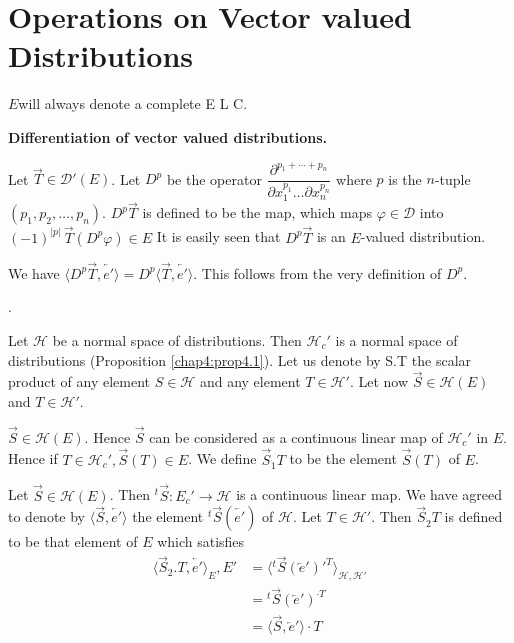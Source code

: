 \chapter{Operations on Vector valued Distributions}\label{chap6}

$E$\pageoriginale will always denote a complete E L C.

\medskip
\noindent
{\bf Differentiation of vector valued distributions.}
\smallskip

Let $\overrightarrow{T} \in \mathscr{D}'(E)$. Let $D^p$ be the
operator $\dfrac{\partial^{p_1+\cdots+ p_n}}{\partial x_{1}^{p_{1}}\ldots
  \partial x_{n}^{p_{n}}}$ where $p$ is the $n$-tuple $(p_1,
p_2,\ldots , p_n)$. $D^p \overrightarrow{T}$ is defined to be the map,
which maps $\varphi \in \mathscr{D}$ into
$(-1)^{|p|}\,\overrightarrow{T}(D^p \varphi) \in E$ It is easily seen
that $D^p\overrightarrow{T}$ is an $E$-valued distribution.   


We have $\langle D^p\overrightarrow{T}, \overleftarrow{e'}\rangle =
D^p \langle \overrightarrow{T}, \overleftarrow{e'}\rangle$. This
follows from the very definition of $D^p$.

\smallskip
{}.

Let $\mathscr{H}$ be a normal space of distributions. Then
$\mathscr{H}_c'$ is a normal space of distributions (Proposition
\ref{chap4:prop4.1}). Let us denote by S.T the scalar product of any element 
$S \in\mathscr{H}$ and any element $T \in \mathscr{H}'$. Let now
$\overrightarrow{S} \in \mathscr{H} (E)$ and $T \in \mathscr{H}'$.

\setcounter{section}{6}
\setcounter{definition}{0}
\begin{definition}\label{chap6:def6.1}
$\overrightarrow{S} \in \mathscr{H}(E)$. Hence $\overrightarrow{S}$
  can be considered as a continuous linear map of $\mathscr{H}_c'$ in
  $E$. Hence if $T \in \mathscr{H}_c', \overrightarrow{S} (T) \in
  E$. We define $\overrightarrow{S}_{\dot{1}} T$ to be the element
  $\overrightarrow{S} (T)$ of $E$.
\end{definition}

\begin{definition}\label{chap6:def6.2}
Let $\overrightarrow{S} \in \mathscr{H} (E)$. Then
${}^t\overrightarrow{S}: E_c' \to \mathscr{H}$ is a continuous linear
map. We have agreed to denote by $\langle \overrightarrow{S},
\overleftarrow{e'} \rangle$ the element ${}^t \overrightarrow{S}
(\overleftarrow{e'})$ of $\mathscr{H}$. Let $T \in \mathscr{H}'$. Then
$\overrightarrow{S}_{\dot{2}} T$ is defined to be that element of $E$ which
satisfies 
\begin{align*}
\langle\overrightarrow{S}_2. T, \overleftarrow{e'} \rangle_E,
 E' &=\langle {}^t \overrightarrow{S} (\overleftarrow{e}')'^{T}\rangle_
{\mathscr{H}, \mathscr{H}'}\\
&= {}^t \overrightarrow{S} (\overleftarrow{e}')^{\cdot T}\\
&= \langle \overrightarrow{S}, \overleftarrow{e}'\rangle \cdot T 
\end{align*}
\end{definition}

